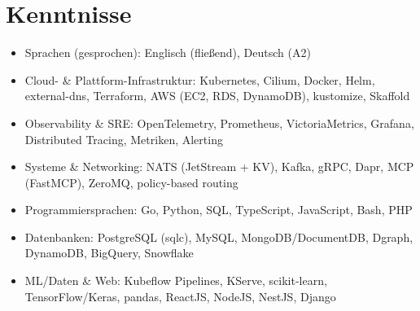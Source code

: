 \documentclass[10pt,a4paper]{resume}
\begin{document}
\section{Kenntnisse}

\begin{itemize}[leftmargin=1.4em,nosep,topsep=2pt]
  \item Sprachen (gesprochen): Englisch (fließend), Deutsch (A2)
  \item Cloud- \& Plattform-Infrastruktur: Kubernetes, Cilium, Docker, Helm, external-dns, Terraform, AWS (EC2, RDS, DynamoDB), kustomize, Skaffold
  \item Observability \& SRE: OpenTelemetry, Prometheus, VictoriaMetrics, Grafana, Distributed Tracing, Metriken, Alerting
  \item Systeme \& Networking: NATS (JetStream + KV), Kafka, gRPC, Dapr, MCP (FastMCP), ZeroMQ, policy-based routing
  \item Programmiersprachen: Go, Python, SQL, TypeScript, JavaScript, Bash, PHP
  \item Datenbanken: PostgreSQL (sqlc), MySQL, MongoDB/DocumentDB, Dgraph, DynamoDB, BigQuery, Snowflake
  \item ML/Daten \& Web: Kubeflow Pipelines, KServe, scikit-learn, TensorFlow/Keras, pandas, ReactJS, NodeJS, NestJS, Django
\end{itemize}
\end{document}
